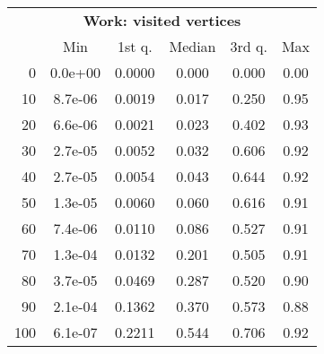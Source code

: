 \begin{tabular}{r|ccccc}
  \multicolumn{6}{c}{{\bf Work: visited vertices}} \\
  & Min & 1st q. & Median & 3rd q. & Max \\ \hline\hline
  0 & 0.0e+00 & 0.0000 & 0.000 & 0.000 & 0.00
\\ 10 & 8.7e-06 & 0.0019 & 0.017 & 0.250 & 0.95
\\ 20 & 6.6e-06 & 0.0021 & 0.023 & 0.402 & 0.93
\\ 30 & 2.7e-05 & 0.0052 & 0.032 & 0.606 & 0.92
\\ 40 & 2.7e-05 & 0.0054 & 0.043 & 0.644 & 0.92
\\ 50 & 1.3e-05 & 0.0060 & 0.060 & 0.616 & 0.91
\\ 60 & 7.4e-06 & 0.0110 & 0.086 & 0.527 & 0.91
\\ 70 & 1.3e-04 & 0.0132 & 0.201 & 0.505 & 0.91
\\ 80 & 3.7e-05 & 0.0469 & 0.287 & 0.520 & 0.90
\\ 90 & 2.1e-04 & 0.1362 & 0.370 & 0.573 & 0.88
\\ 100 & 6.1e-07 & 0.2211 & 0.544 & 0.706 & 0.92
\end{tabular}
